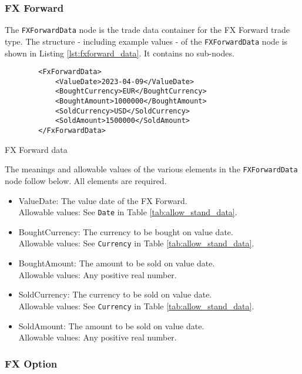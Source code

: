 \subsubsection{FX Forward}

The \lstinline!FXForwardData!  node is the trade data container for the FX Forward trade type.  The structure -
including example values - of the \lstinline!FXForwardData!  node is shown in Listing \ref{lst:fxforward_data}. It
contains no sub-nodes.

\begin{listing}[H]
\begin{verbatim}
        <FxForwardData>
            <ValueDate>2023-04-09</ValueDate>
            <BoughtCurrency>EUR</BoughtCurrency>
            <BoughtAmount>1000000</BoughtAmount>
            <SoldCurrency>USD</SoldCurrency>
            <SoldAmount>1500000</SoldAmount>
        </FxForwardData>
\end{verbatim}
\caption{FX Forward data}
\label{lst:fxforward_data}
\end{listing}

The meanings and allowable values of the various elements in the \lstinline!FXForwardData!  node follow below.  All elements are required.

\begin{itemize}
\item ValueDate: The value date of the FX Forward. \\ Allowable values:  See \lstinline!Date! in Table \ref{tab:allow_stand_data}.
\item BoughtCurrency: The currency to be bought on value date.  \\ Allowable values:  See \lstinline!Currency! in Table \ref{tab:allow_stand_data}.
\item BoughtAmount: The amount to be sold on value date.  \\ Allowable values:  Any positive real number.
\item SoldCurrency: The currency to be sold on value date.  \\ Allowable values:  See \lstinline!Currency! in Table \ref{tab:allow_stand_data}.
\item SoldAmount: The amount to be sold on value date.  \\ Allowable values:  Any positive real number.

\end{itemize}


\subsubsection{FX Option}

